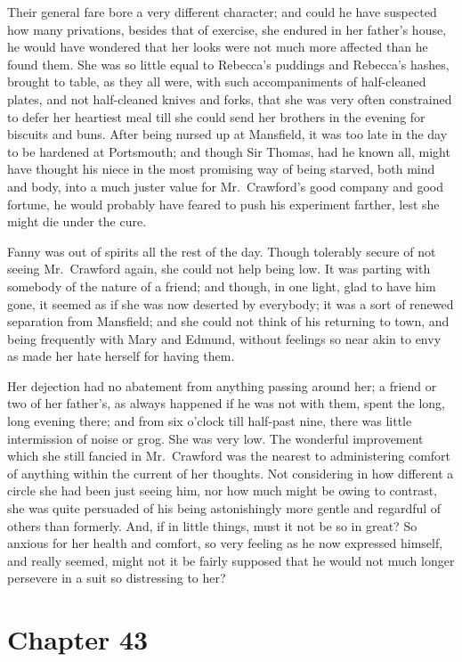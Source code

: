 Their general fare bore a very different character;
and could he have suspected how many privations, besides that
of exercise, she endured in her father's house, he would
have wondered that her looks were not much more affected
than he found them.  She was so little equal to Rebecca's
puddings and Rebecca's hashes, brought to table, as they
all were, with such accompaniments of half-cleaned plates,
and not half-cleaned knives and forks, that she was very
often constrained to defer her heartiest meal till she could
send her brothers in the evening for biscuits and buns.
After being nursed up at Mansfield, it was too late in the
day to be hardened at Portsmouth; and though Sir Thomas,
had he known all, might have thought his niece in the
most promising way of being starved, both mind and body,
into a much juster value for Mr.\ Crawford's good company
and good fortune, he would probably have feared to push
his experiment farther, lest she might die under the cure.

Fanny was out of spirits all the rest of the day.
Though tolerably secure of not seeing Mr.\ Crawford again,
she could not help being low.  It was parting with somebody
of the nature of a friend; and though, in one light,
glad to have him gone, it seemed as if she was now
deserted by everybody; it was a sort of renewed separation
from Mansfield; and she could not think of his returning
to town, and being frequently with Mary and Edmund,
without feelings so near akin to envy as made her hate
herself for having them.

Her dejection had no abatement from anything passing
around her; a friend or two of her father's, as always
happened if he was not with them, spent the long,
long evening there; and from six o'clock till half-past nine,
there was little intermission of noise or grog.  She was
very low.  The wonderful improvement which she still
fancied in Mr.\ Crawford was the nearest to administering
comfort of anything within the current of her thoughts.
Not considering in how different a circle she had been
just seeing him, nor how much might be owing to contrast,
she was quite persuaded of his being astonishingly
more gentle and regardful of others than formerly.
And, if in little things, must it not be so in great?
So anxious for her health and comfort, so very feeling
as he now expressed himself, and really seemed, might not
it be fairly supposed that he would not much longer
persevere in a suit so distressing to her?



\chapter{Chapter 43}


